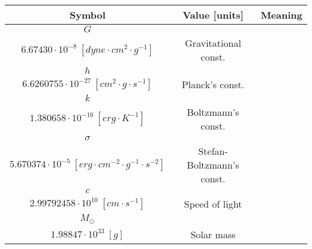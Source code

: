 \vspace{10mm}
\begin{center}

\begingroup
\def\arraystretch{1.5}

\begin{tabularx}{\textwidth}{ccX}
\hline
\hline
\textbf{Symbol}	& \textbf{Value [units]} & \textbf{Meaning} \\
\hline
\hline
$G$	&
	\begin{tabular}{c}
		 $6.67430 \cdot 10^{-11}\ [N \cdot m^2 \cdot kg^{-2}]$ \\
		 $6.67430 \cdot 10^{-8}\ [dyne \cdot cm^2 \cdot g^{-1}]$
	\end{tabular} 
	& Gravitational const. \\

$h$ &
	\begin{tabular}{c}
		 $...$ \\
		 $6.6260755 \cdot 10^{-27}\ [cm^2 \cdot g \cdot s^{-1}]$
	\end{tabular} 
	& Planck's const. \\
	
$k$ &
	\begin{tabular}{c}
		 $...$ \\
		 $1.380658 \cdot 10^{-16}\ [erg \cdot K^{-1}]$
	\end{tabular} 
	& Boltzmann's const. \\
	
$\sigma$ &
	\begin{tabular}{c}
		 $...$ \\
		 $5.670374 \cdot 10^{-5}\ [erg \cdot cm^{-2} \cdot g^{-1} \cdot s^{-2}]$
	\end{tabular} 
	& Stefan-Boltzmann's const. \\

$c$ &
	\begin{tabular}{c}
		 $2.99792458 \cdot 10^{8}\ [m \cdot s^{-1}]$ \\
		 $2.99792458 \cdot 10^{10}\ [cm \cdot s^{-1}]$
	\end{tabular} 
	& Speed of light \\
	
	
$M_{\odot}$	&
	\begin{tabular}{c}
		 $1.98847\cdot 10^{30}\ [kg]$ \\
		 $1.98847\cdot 10^{33}\ [g]$
	\end{tabular} 
	& Solar mass \\
	
\hline

\end{tabularx}

\endgroup

\end{center}